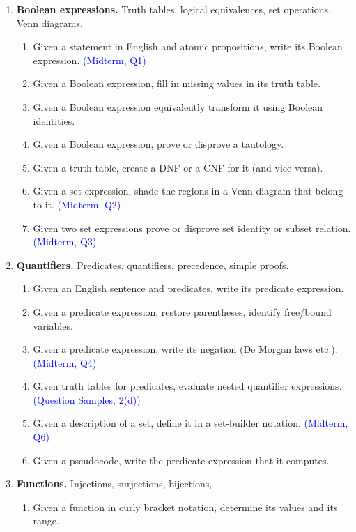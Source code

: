 \documentclass[a4paper,12pt]{article}
\begin{document}
{\small
\begin{enumerate}

\item \textbf{Boolean expressions.} Truth tables, logical equivalences, set operations, Venn diagrams.
\begin{enumerate}
\item Given a statement in English and atomic propositions, write its Boolean expression. \textcolor{blue}{(Midterm, Q1)}
\item Given a Boolean expression, fill in missing values in its truth table.
\item Given a Boolean expression equivalently transform it using Boolean identities.
\item Given a Boolean expression, prove or disprove a tautology.
\item Given a truth table, create a DNF or a CNF for it (and vice versa).
\item Given a set expression, shade the regions in a Venn diagram that belong to it. \textcolor{blue}{(Midterm, Q2)}
\item Given two set expressions prove or disprove set identity or subset relation. \textcolor{blue}{(Midterm, Q3)}
\end{enumerate}
\item \textbf{Quantifiers.} Predicates, quantifiers, precedence, simple proofs.
\begin{enumerate} 
\item Given an English sentence and predicates, write its predicate expression.
\item Given a predicate expression, restore parentheses, identify free/bound variables.
\item Given a predicate expression, write its negation (De Morgan laws etc.). \textcolor{blue}{(Midterm, Q4)}
\item Given truth tables for predicates, evaluate nested quantifier expressions. \textcolor{blue}{(Question Samples, 2(d))}
\item Given a description of a set, define it in a set-builder notation.  \textcolor{blue}{(Midterm, Q6)}
\item Given a pseudocode, write the predicate expression that it computes. 
\end{enumerate}
\item \textbf{Functions.} Injections, surjections, bijections, 
\begin{enumerate}
\item Given a function in curly bracket notation, determine its values and its range.

\end{enumerate}
\end{enumerate}}
\end{document}
